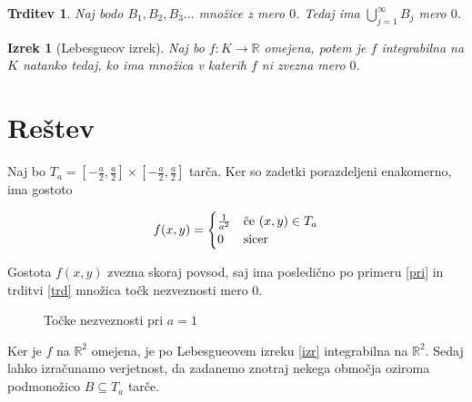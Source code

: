 \documentclass{amsart}
\newcommand{\R}{\mathbb{R}}
\theoremstyle{definition} %
\theoremstyle{plain} %
\newtheorem{izrek}[definicija]{Izrek}
\newtheorem{trditev}[definicija]{Trditev}
\newtheorem{posledica}[definicija]{Posledica}
\begin{document}
\begin{trditev}\label{trd}
    Naj bodo $B_1, B_2, B_3 \ldots $ množice z mero $0$. Tedaj ima $\bigcup_{j=1}^{\infty} B_{j}$ mero $0$.
\end{trditev}


\begin{izrek}[Lebesgueov izrek]\label{izr}
    Naj bo $f \colon K \to \R $ omejena, potem je $f$ integrabilna na $K$ natanko tedaj, ko ima množica
    v katerih $f$ ni zvezna mero $0$.
\end{izrek}

\section{Reštev}

Naj bo $T_a = \left[ -\frac{a}{2} , \frac{a}{2}\right]\times\left[-\frac{a}{2},\frac{a}{2}\right]$
tarča. Ker so zadetki porazdeljeni enakomerno, ima gostoto

\begin{equation*}
    f(x,y) = 
    \begin{cases}
        \frac{1}{a^2} & \text{če $ (x,y) \in T_a  $} \\
        0 & \text{sicer}
    \end{cases}
\end{equation*}

Gostota $f(x,y)$ zvezna skoraj povsod, saj ima posledično po primeru \eqref{pri} in trditvi 
\eqref{trd} množica točk nezveznosti mero $0$.

\begin{figure}[h]
    \centering
    \caption{Točke nezveznosti pri $a=1$}
\end{figure}

Ker je $f$ na $\R^2$ omejena, je po Lebesgueovem izreku \eqref{izr} integrabilna na $\R^2$.
Sedaj lahko izračunamo verjetnost, da zadanemo znotraj nekega območja oziroma podmonožico 
$B \subseteq T_a$ tarče.
\end{document}

